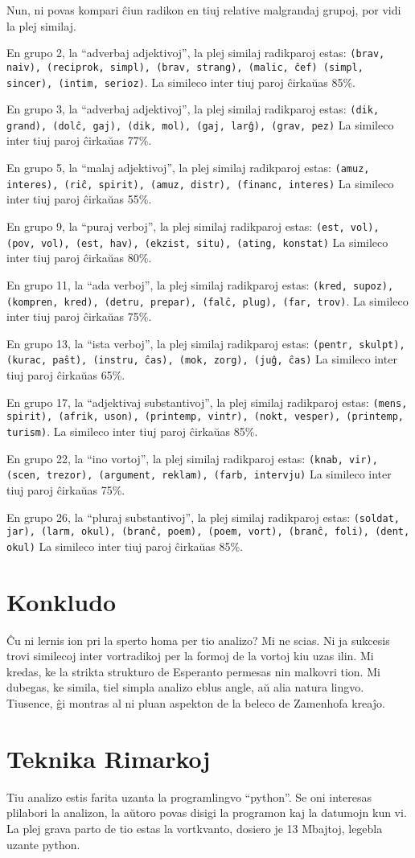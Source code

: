\documentclass[12pt,twoside]{article}
\begin{document}
Nun, ni povas kompari ĉiun radikon en tiuj relative malgrandaj grupoj, por vidi la plej similaj.

En grupo 2, la ``adverbaj adjektivoj'', la plej similaj radikparoj estas: \texttt{(brav, naiv), (reciprok, simpl), (brav, strang), (malic, ĉef)
(simpl, sincer), (intim, serioz)}. La simileco inter tiuj paroj ĉirkaŭas 85\%.

En grupo 3, la ``adverbaj adjektivoj'', la plej similaj radikparoj estas: \texttt{(dik, grand), (dolĉ, gaj), (dik, mol), (gaj, larĝ), (grav, pez)}
La simileco inter tiuj paroj ĉirkaŭas 77\%.

En grupo 5, la ``malaj adjektivoj'', la plej similaj radikparoj estas: \texttt{(amuz, interes), (riĉ, spirit), (amuz, distr), (financ, interes)}
La simileco inter tiuj paroj ĉirkaŭas 55\%.

En grupo 9, la ``puraj verboj'', la plej similaj radikparoj estas: \texttt{(est, vol), (pov, vol), (est, hav), (ekzist, situ), (ating, konstat)}
La simileco inter tiuj paroj ĉirkaŭas 80\%.

En grupo 11, la ``ada verboj'', la plej similaj radikparoj estas: \texttt{(kred, supoz), (kompren, kred), (detru, prepar), 
(falĉ, plug), (far, trov)}. La simileco inter tiuj paroj ĉirkaŭas 75\%.

En grupo 13, la ``ista verboj'', la plej similaj radikparoj estas: \texttt{(pentr, skulpt), (kurac, paŝt), (instru, ĉas), (mok, zorg), (juĝ, ĉas)}
La simileco inter tiuj paroj ĉirkaŭas 65\%.

En grupo 17, la ``adjektivaj substantivoj'', la plej similaj radikparoj estas: \texttt{(mens, spirit), (afrik, uson), 
(printemp, vintr), (nokt, vesper), (printemp, turism)}. La simileco inter tiuj paroj ĉirkaŭas 85\%.
 
En grupo 22, la ``ino vortoj'', la plej similaj radikparoj estas: \texttt{(knab, vir), (scen, trezor), (argument, reklam), (farb, intervju)}
La simileco inter tiuj paroj ĉirkaŭas 75\%.

En grupo 26, la ``pluraj substantivoj'', la plej similaj radikparoj estas: \texttt{(soldat, jar), (larm, okul), (branĉ, poem), (poem, vort), (branĉ, foli), (dent, okul)}
La simileco inter tiuj paroj ĉirkaŭas 85\%.

\section{Konkludo}

Ĉu ni lernis ion pri la sperto homa per tio analizo? Mi ne scias. 
Ni ja sukcesis trovi similecoj inter vortradikoj per la formoj de la vortoj kiu uzas ilin. Mi kredas, ke la strikta strukturo de Esperanto permesas
nin malkovri tion. Mi dubegas, ke simila, tiel simpla analizo eblus angle, aŭ alia natura lingvo. 
Tiusence, ĝi montras al ni pluan aspekton de la beleco de Zamenhofa kreaĵo.

\section{Teknika Rimarkoj}

Tiu analizo estis farita uzanta la programlingvo ``python''. Se oni interesas plilabori la analizon, la aŭtoro povas disigi la programon kaj la
datumojn kun vi. La plej grava parto de tio estas la vortkvanto, dosiero je 13 Mbajtoj, legebla uzante python.
\end{document}
